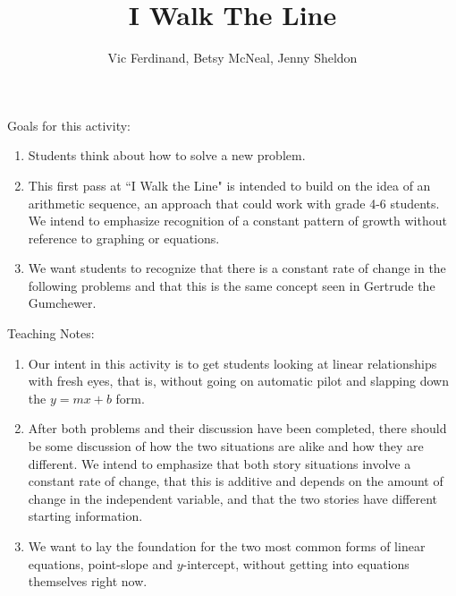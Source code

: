 \documentclass{ximera}
\title{I Walk The Line}
\author{Vic Ferdinand, Betsy McNeal, Jenny Sheldon}
\begin{document}
\begin{abstract}
\end{abstract}
\maketitle

\begin{instructorIntro}
Goals for this activity:
\begin{enumerate}
\item Students think about how to solve a new problem.
\item  This first pass at ``I Walk the Line" is intended to build on the idea of an arithmetic sequence, an approach that could work with grade 4-6 students.  We intend to emphasize  recognition of a constant pattern of growth without reference to graphing or equations.
\item We want students to recognize that there is a constant rate of change in the following problems and that this is the same concept seen in Gertrude the Gumchewer.
\end{enumerate}

Teaching Notes:
\begin{enumerate}
\item Our intent in this activity is to get students looking at linear relationships with fresh eyes, that is, without going on automatic pilot and slapping down the $y = mx + b$ form.
\item  After both problems and their discussion have been completed, there should be some discussion of how the two situations are alike and how they are different.  We intend to emphasize that both story situations involve a constant rate of change, that this is additive and depends on the amount of change in the independent variable, and that the two stories have different starting information.  
\item  We want to lay the foundation for the two most common forms of linear equations, point-slope and $y$-intercept, without getting into equations themselves right now.  
\end{enumerate}
\end{instructorIntro}
\end{document}
